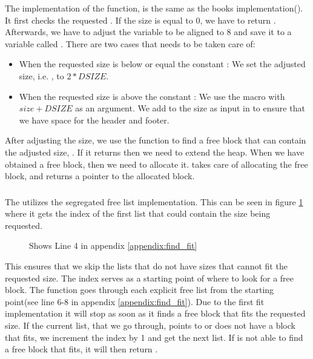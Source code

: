 The implementation of the  function, is the same as the books implementation(\cite[ch. 9.9.12]{csapp-mem}).
It first checks the requested . If the size is equal to 0, we have to return .
Afterwards, we have to adjust the variable  to be aligned to 8 and save it to a variable called . There are two cases that needs to be taken care of:
\begin{itemize}
    \item When the requested size is below or equal the constant : We set the adjusted size, i.e. , to $2 * DSIZE$.
    \item When the requested size is above the constant : We use the  macro with $size + DSIZE$ as an argument. We add  to the size as input
    in  to ensure that we have space for the header and footer.
\end{itemize}

After adjusting the size, we use the  function to find a free block that can contain the adjusted size, . If it returns  then we need to extend the heap.  When we have obtained a free block, then we need to allocate it. 
 takes care of allocating the free block, and returns a pointer to the allocated block.

\subsubsection{}

The  utilizes the segregated free list implementation. This can be seen in figure \ref{fig:get-list-index} where it gets the index of the first list that could contain the size being requested.
\begin{figure}[h]
    \centering
    \caption{Shows Line 4 in appendix \ref{appendix:find_fit}}
    \label{fig:get-list-index}
\end{figure}
This ensures that we skip the lists that do not have sizes that cannot fit the requested size. The index serves as a starting point of where to look for a free block. The function goes through each explicit free list from the starting point(see line 6-8 in appendix \ref{appendix:find_fit}).
Due to the first fit implementation it will stop as soon as it finds a free block that fits the requested size. 
If the current list, that we go through, points to  or does not have a block that fits, we increment the index by 1 and get the next list.
If  is not able to find a free block that fits, it will then return .

